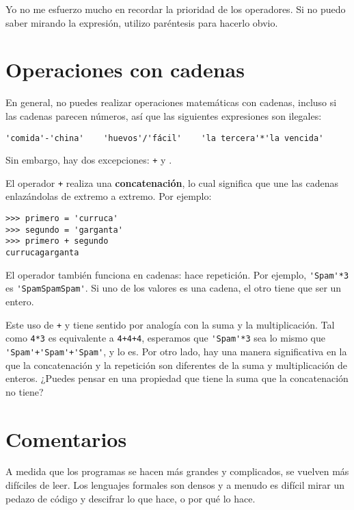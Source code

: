 \documentclass[10pt]{book}
\begin{document}
Yo no me esfuerzo mucho en recordar la prioridad de los
operadores. Si no puedo saber mirando la expresión, utilizo
paréntesis para hacerlo obvio.


\section{Operaciones con cadenas}

En general, no puedes realizar operaciones matemáticas con cadenas, incluso
si las cadenas parecen números, así que las siguientes expresiones son ilegales:

\begin{verbatim}
'comida'-'china'    'huevos'/'fácil'    'la tercera'*'la vencida'
\end{verbatim}
%
Sin embargo, hay dos excepciones: {\tt +} y {\tt *}.

El operador {\tt +} realiza una {\bf concatenación}, lo cual significa que
une las cadenas enlazándolas de extremo a extremo.  Por ejemplo:

\begin{verbatim}
>>> primero = 'curruca'
>>> segundo = 'garganta'
>>> primero + segundo
currucagarganta
\end{verbatim}
%
El operador {\tt *} también funciona en cadenas: hace repetición.
Por ejemplo, \verb"'Spam'*3" es \verb"'SpamSpamSpam'".  Si uno de los
valores es una cadena, el otro tiene que ser un entero.

Este uso de {\tt +} y {\tt *} tiene sentido por
analogía con la suma y la multiplicación.  Tal como {\tt 4*3} es
equivalente a {\tt 4+4+4}, esperamos que \verb"'Spam'*3" sea lo mismo que
\verb"'Spam'+'Spam'+'Spam'", y lo es.  Por otro lado, hay una
manera significativa en la que la concatenación y la repetición son
diferentes de la suma y multiplicación de enteros.
¿Puedes pensar en una propiedad que tiene la suma
que la concatenación no tiene?


\section{Comentarios}

A medida que los programas se hacen más grandes y complicados, se vuelven más difíciles
de leer.  Los lenguajes formales son densos y a menudo es difícil
mirar un pedazo de código y descifrar lo que hace, o por qué lo hace.
\end{document}
